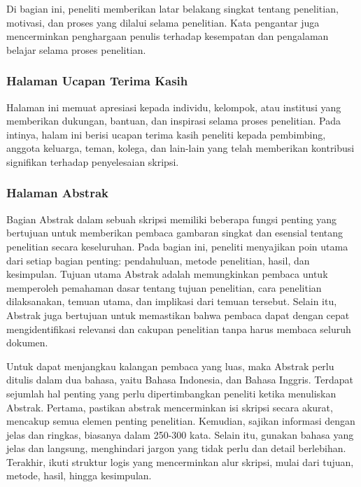 \documentclass[
  indonesian,
  letterpaper,
]{scrbook}
\begin{document}
Di bagian ini, peneliti memberikan latar belakang singkat tentang
penelitian, motivasi, dan proses yang dilalui selama penelitian. Kata
pengantar juga mencerminkan penghargaan penulis terhadap kesempatan dan
pengalaman belajar selama proses penelitian.

\subsubsection{Halaman Ucapan Terima
Kasih}\label{halaman-ucapan-terima-kasih}

Halaman ini memuat apresiasi kepada individu, kelompok, atau institusi
yang memberikan dukungan, bantuan, dan inspirasi selama proses
penelitian. Pada intinya, halam ini berisi ucapan terima kasih peneliti
kepada pembimbing, anggota keluarga, teman, kolega, dan lain-lain yang
telah memberikan kontribusi signifikan terhadap penyelesaian skripsi.

\subsubsection{Halaman Abstrak}\label{halaman-abstrak}

Bagian Abstrak dalam sebuah skripsi memiliki beberapa fungsi penting
yang bertujuan untuk memberikan pembaca gambaran singkat dan esensial
tentang penelitian secara keseluruhan. Pada bagian ini, peneliti
menyajikan poin utama dari setiap bagian penting: pendahuluan, metode
penelitian, hasil, dan kesimpulan. Tujuan utama Abstrak adalah
memungkinkan pembaca untuk memperoleh pemahaman dasar tentang tujuan
penelitian, cara penelitian dilaksanakan, temuan utama, dan implikasi
dari temuan tersebut. Selain itu, Abstrak juga bertujuan untuk
memastikan bahwa pembaca dapat dengan cepat mengidentifikasi relevansi
dan cakupan penelitian tanpa harus membaca seluruh dokumen.

Untuk dapat menjangkau kalangan pembaca yang luas, maka Abstrak perlu
ditulis dalam dua bahasa, yaitu Bahasa Indonesia, dan Bahasa Inggris.
Terdapat sejumlah hal penting yang perlu dipertimbangkan peneliti ketika
menuliskan Abstrak. Pertama, pastikan abstrak mencerminkan isi skripsi
secara akurat, mencakup semua elemen penting penelitian. Kemudian,
sajikan informasi dengan jelas dan ringkas, biasanya dalam 250-300 kata.
Selain itu, gunakan bahasa yang jelas dan langsung, menghindari jargon
yang tidak perlu dan detail berlebihan. Terakhir, ikuti struktur logis
yang mencerminkan alur skripsi, mulai dari tujuan, metode, hasil, hingga
kesimpulan.
\end{document}
